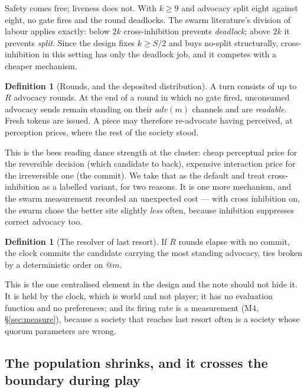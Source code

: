 \documentclass[11pt,a4paper]{article}
\makeatletter
\theoremstyle{plain}
\theoremstyle{definition}
\newtheorem{definition}[theorem]{Definition}
\theoremstyle{remark}
\newcommand{\qt}[1]{\ensuremath{@#1}}
\makeatother
\begin{document}
Safety comes free; liveness does not. With $k \geq 9$ and advocacy split eight
against eight, no gate fires and the round deadlocks. The swarm literature's
division of labour applies exactly: below $2k$ cross-inhibition prevents
\emph{deadlock}; above $2k$ it prevents \emph{split}. Since the design fixes
$k \geq S/2$ and buys no-split structurally, cross-inhibition in this setting
has only the deadlock job, and it competes with a cheaper mechanism.

\begin{definition}[Rounds, and the deposited distribution]
\label{def:rounds}
A turn consists of up to $R$ advocacy rounds. At the end of a round in which no
gate fired, unconsumed advocacy sends remain standing on their
$\mathit{adv}(m)$ channels and are \emph{readable}. Fresh tokens are issued. A
piece may therefore re-advocate having perceived, at perception prices, where
the rest of the society stood.
\end{definition}

This is the bees reading dance strength at the cluster: cheap perceptual price
for the reversible decision (which candidate to back), expensive interaction
price for the irreversible one (the commit). We take that as the default and
treat cross-inhibition as a labelled variant, for two reasons. It is one more
mechanism, and the swarm measurement recorded an unexpected cost --- with cross
inhibition on, the swarm chose the better site slightly \emph{less} often,
because inhibition suppresses correct advocacy too.

\begin{definition}[The resolver of last resort]
\label{def:lastresort}
If $R$ rounds elapse with no commit, the clock commits the candidate carrying
the most standing advocacy, ties broken by a deterministic order on $\qt{m}$.
\end{definition}

This is the one centralised element in the design and the note should not hide
it. It is held by the clock, which is world and not player; it has no evaluation
function and no preferences; and its firing rate is a measurement
(M4, \S\ref{sec:measure}), because a society that reaches last resort often is a
society whose quorum parameters are wrong.

\subsection{The population shrinks, and it crosses the boundary during play}
\end{document}
